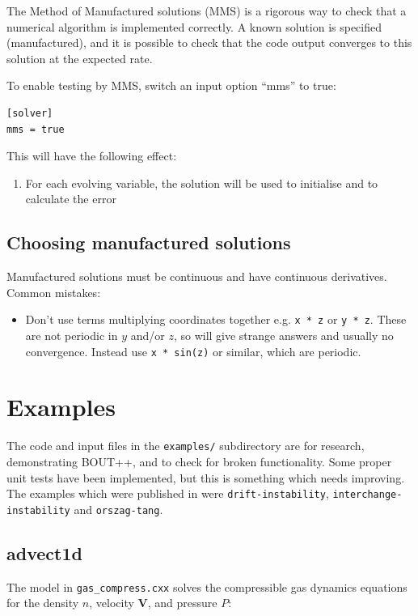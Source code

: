 \documentclass[12pt]{article}
\begin{document}
The Method of Manufactured solutions (MMS) is a rigorous way to check
that a numerical algorithm is implemented correctly. A known
solution is specified (manufactured), and it is possible to check that
the code output converges to this solution at the expected rate.

To enable testing by MMS, switch an input option ``mms'' to true:
\begin{lstlisting}
[solver]
mms = true
\end{lstlisting}
This will have the following effect:
\begin{enumerate}
\item For each evolving variable, the solution will be used to initialise
  and to calculate the error
\end{enumerate}

\subsection{Choosing manufactured solutions}

Manufactured solutions must be continuous and have continuous derivatives.
Common mistakes:
\begin{itemize}
\item Don't use terms multiplying coordinates together e.g. \texttt{x * z} or \texttt{y * z}. These are not periodic in $y$ and/or $z$, so will give strange answers and usually no convergence. Instead use \texttt{x * sin(z)} or similar, which are periodic.
\end{itemize}


\section{Examples}
\label{sec:examples}

The code and input files in the \texttt{examples/} subdirectory are for research, demonstrating BOUT++, 
and to check for broken functionality. Some proper unit tests have been implemented, but this
is something which needs improving. The examples which were published in \cite{Dudson2009,dudson-2008-arxiv}
were \texttt{drift-instability}, \texttt{interchange-instability} and \texttt{orszag-tang}.


\subsection{advect1d}

The model in \texttt{gas\_compress.cxx} solves the compressible gas dynamics equations for
the density $n$, velocity $\mathbf{V}$, and pressure $P$:
\end{document}
